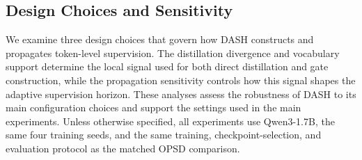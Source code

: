 \documentclass[letterpaper]{article} %
\begin{document}









\subsection{Design Choices and Sensitivity}
\label{subsec:parameter_ablations}

We examine three design choices that govern how DASH constructs and
propagates token-level supervision. The distillation divergence and
vocabulary support determine the local signal used for both direct
distillation and gate construction, while the propagation sensitivity
controls how this signal shapes the adaptive supervision horizon.
These analyses assess the robustness of DASH to its main configuration
choices and support the settings used in the main experiments. Unless
otherwise specified, all experiments use Qwen3-1.7B, the same four
training seeds, and the same training, checkpoint-selection, and
evaluation protocol as the matched OPSD comparison.
\end{document}
